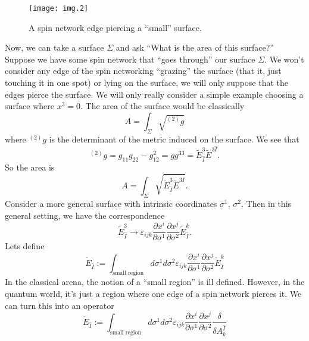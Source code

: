 \begin{figure}
\texttt{[image: img.2]}
\caption{A spin network edge piercing a ``small'' surface.}\label{fig:img2}
\end{figure}
Now, we can take a surface $\Sigma$ and ask ``What is the area of
this surface?'' Suppose we have some spin network that ``goes
through'' our surface $\Sigma$. We won't consider any edge of the
spin networking ``grazing'' the surface (that it, just touching
it in one spot) or lying on the surface, we will only suppose
that the edges pierce the surface. We will only really consider a
simple example choosing a surface where $x^3=0$. The area of the
surface would be classically 
\begin{equation}
A = \int_{\Sigma}\sqrt{{}^{(2)}g}
\end{equation}
where ${}^{(2)}g$ is the determinant of the metric induced on the
surface. We see that
\begin{equation}
{}^{(2)}g = g_{11}g_{22}-g_{12}^{2} =
gg^{33}=\widetilde{E}^{3}_{\hat{I}}\widetilde{E}^{3\hat{I}}.
\end{equation}
So the area is
\begin{equation}
A = \int_{\Sigma} \sqrt{\widetilde{E}^{3}_{\hat{I}}\widetilde{E}^{3\hat{I}}}.
\end{equation}
Consider a more general surface with intrinsic coordinates
$\sigma^1$, $\sigma^2$. Then in this general setting, we have the
correspondence
\begin{equation}
\widetilde{E}^{3}_{\hat{I}}\to\varepsilon_{ijk}\frac{\partial
  x^{i}}{\partial \sigma^{1}}\frac{\partial x^{j}}{\partial
  \sigma^{2}}\widetilde{E}^{k}_{\hat{I}}.
\end{equation}
Lets define
\begin{equation}
\widetilde{E}_{\hat{I}}:=\int_{\text{small
    region}}d\sigma^{1}d\sigma^{2}\varepsilon_{ijk}\frac{\partial
  x^i}{\partial \sigma^1}\frac{\partial x^j}{\partial
  \sigma^2}\widetilde{E}^{k}_{\hat{I}}
\end{equation}
In the classical arena, the notion of a ``small region'' is ill
defined. However, in the quantum world, it's just a region where
one edge of a spin network pierces it. We can turn this into an
operator
\begin{equation}
\widetilde{E}_{\hat{I}}:=\int_{\text{small
    region}}d\sigma^{1}d\sigma^{2}\varepsilon_{ijk}\frac{\partial
  x^i}{\partial \sigma^1}\frac{\partial x^j}{\partial
  \sigma^2}\frac{\delta}{\delta A^{\hat{I}}_{k}}
\end{equation}
